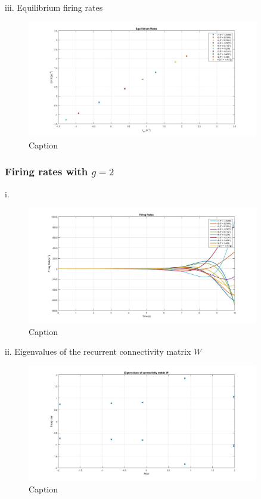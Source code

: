 \documentclass{article}
\begin{document}
iii. Equilibrium firing rates
\begin{figure}[H] 
	\begin{center}
		\includegraphics[width=0.9\textwidth]{Section1/Part2/Retry/Q2a_iii.jpg}
		\caption{Caption \label{Q2a_iii}}
	\end{center}
\end{figure}


\subsubsection{Firing rates with $g = 2$}
i. 
\begin{figure}[H] 
	\begin{center}
		\includegraphics[width=0.9\textwidth]{Section1/Part2/Retry/Q2a_i_g2.jpg}
		\caption{Caption \label{Q2a_i_g2}}
	\end{center}
\end{figure}

ii. Eigenvalues of the recurrent connectivity matrix $W$
\begin{figure}[H] 
	\begin{center}
		\includegraphics[width=0.9\textwidth]{Section1/Part2/Retry/Q2a_ii_g2.jpg}
		\caption{Caption \label{Q2a_ii_g2}}
	\end{center}
\end{figure}
\end{document}

